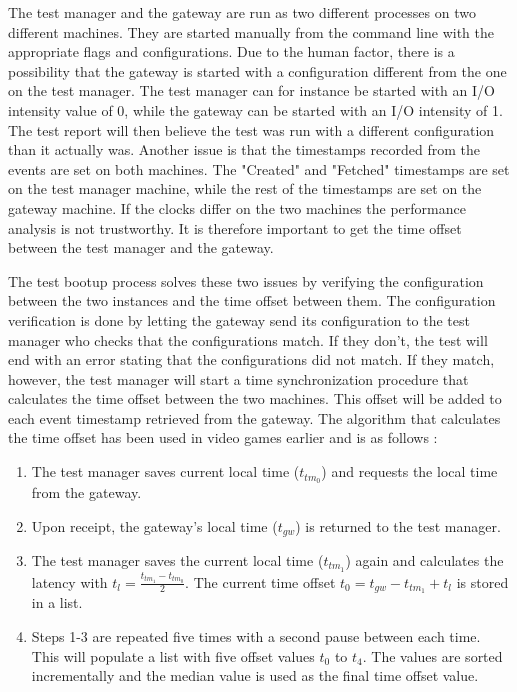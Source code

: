 The test manager and the gateway are run as two different processes on two
different machines. They are started manually from the command line with the
appropriate flags and configurations. Due to the human factor, there is a
possibility that the gateway is started with a configuration different from the
one on the test manager. The test manager can for instance be started with an
I/O intensity value of 0, while the gateway can be started with an I/O
intensity of 1. The test report will then believe the test was run with a
different configuration than it actually was. Another issue is that the
timestamps recorded from the events are set on both machines. The "Created" and
"Fetched" timestamps are set on the test manager machine, while the rest of the
timestamps are set on the gateway machine. If the clocks differ on the two
machines the performance analysis is not trustworthy. It is therefore important
to get the time offset between the test manager and the gateway.

The test bootup process solves these two issues by verifying the configuration
between the two instances and the time offset between them. The configuration
verification is done by letting the gateway send its configuration to the test
manager who checks that the configurations match. If they don't, the test will
end with an error stating that the configurations did not match. If they match,
however, the test manager will start a time synchronization procedure that
calculates the time offset between the two machines. This offset will be added
to each event timestamp retrieved from the gateway. The algorithm that
calculates the time offset has been used in video games earlier and is as
follows \cite{simpson2004stream}:

\begin{enumerate}
    \item The test manager saves current local time ($t_{tm_0}$) and requests the
local time from the gateway.
    \item Upon receipt, the gateway's local time ($t_{gw}$) is returned to the
test manager.
    \item The test manager saves the current local time ($t_{tm_1}$) again and
calculates the latency with $t_l = \frac{t_{tm_1} - t_{tm_0}}{2}$. The current time
offset $t_0 = t_{gw} - t_{tm_1} + t_l$ is stored in a list.
    \item Steps 1-3 are repeated five times with a second pause between each
time. This will populate a list with five offset values $t_0$ to $t_4$. The
values are sorted incrementally and the median value is used as the final
time offset value.
\end{enumerate}

